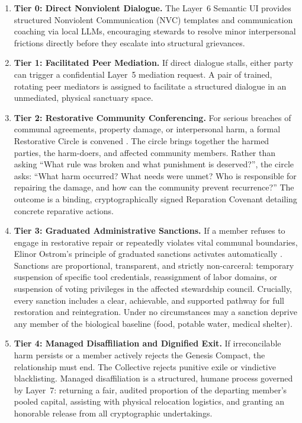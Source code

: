 \begin{enumerate}
    \item \textbf{Tier 0: Direct Nonviolent Dialogue.} The Layer~6 Semantic UI provides structured Nonviolent Communication (NVC) templates and communication coaching via local LLMs, encouraging stewards to resolve minor interpersonal frictions directly before they escalate into structural grievances.
    \item \textbf{Tier 1: Facilitated Peer Mediation.} If direct dialogue stalls, either party can trigger a confidential Layer~5 mediation request. A pair of trained, rotating peer mediators is assigned to facilitate a structured dialogue in an unmediated, physical sanctuary space.
    \item \textbf{Tier 2: Restorative Community Conferencing.} For serious breaches of communal agreements, property damage, or interpersonal harm, a formal Restorative Circle is convened \parencite{zehr1990}. The circle brings together the harmed parties, the harm-doers, and affected community members. Rather than asking ``What rule was broken and what punishment is deserved?'', the circle asks: ``What harm occurred? What needs were unmet? Who is responsible for repairing the damage, and how can the community prevent recurrence?'' The outcome is a binding, cryptographically signed Reparation Covenant detailing concrete reparative actions.
    \item \textbf{Tier 3: Graduated Administrative Sanctions.} If a member refuses to engage in restorative repair or repeatedly violates vital communal boundaries, Elinor Ostrom's principle of graduated sanctions activates automatically \parencite{ostrom1990}. Sanctions are proportional, transparent, and strictly non-carceral: temporary suspension of specific tool credentials, reassignment of labor domains, or suspension of voting privileges in the affected stewardship council. Crucially, every sanction includes a clear, achievable, and supported pathway for full restoration and reintegration. Under no circumstances may a sanction deprive any member of the biological baseline (food, potable water, medical shelter).
    \item \textbf{Tier 4: Managed Disaffiliation and Dignified Exit.} If irreconcilable harm persists or a member actively rejects the Genesis Compact, the relationship must end. The Collective rejects punitive exile or vindictive blacklisting. Managed disaffiliation is a structured, humane process governed by Layer~7: returning a fair, audited proportion of the departing member's pooled capital, assisting with physical relocation logistics, and granting an honorable release from all cryptographic undertakings.
\end{enumerate}

